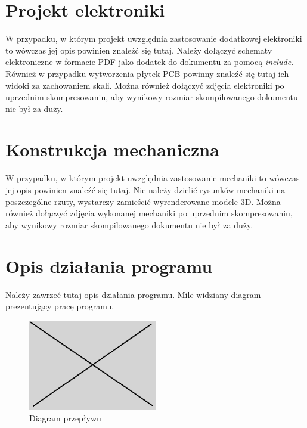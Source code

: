 \documentclass[10pt, a4paper]{article}
\begin{document}
\section{Projekt elektroniki}

W przypadku, w którym projekt uwzględnia zastosowanie 
dodatkowej elektroniki to wówczas jej opis powinien znaleźć się tutaj.
Należy dołączyć schematy elektroniczne w formacie PDF 
jako dodatek do dokumentu 
za pomocą \textit{include}. Również w przypadku wytworzenia 
płytek PCB powinny znaleźć się tutaj ich widoki za zachowaniem skali.
Można również dołączyć zdjęcia 
elektroniki po uprzednim skompresowaniu, aby wynikowy rozmiar 
skompilowanego dokumentu nie był za duży.

\section{Konstrukcja mechaniczna}

W przypadku, w którym projekt uwzględnia zastosowanie 
mechaniki to wówczas jej opis powinien znaleźć się tutaj.
Nie należy dzielić rysunków mechaniki na poszczególne rzuty, 
wystarczy zamieścić wyrenderowane modele 3D.
Można również dołączyć zdjęcia wykonanej 
mechaniki po uprzednim skompresowaniu, aby wynikowy rozmiar 
skompilowanego dokumentu nie był za duży.

\section{Opis działania programu}

Należy zawrzeć tutaj opis działania programu.
Mile widziany diagram prezentujący pracę programu.

\begin{figure}[H]
	\centering
	\includegraphics[width=0.5\textwidth]{figures/obraz.png}
	\caption{Diagram przepływu}
	\label{fig:Program}
\end{figure}
\end{document}

